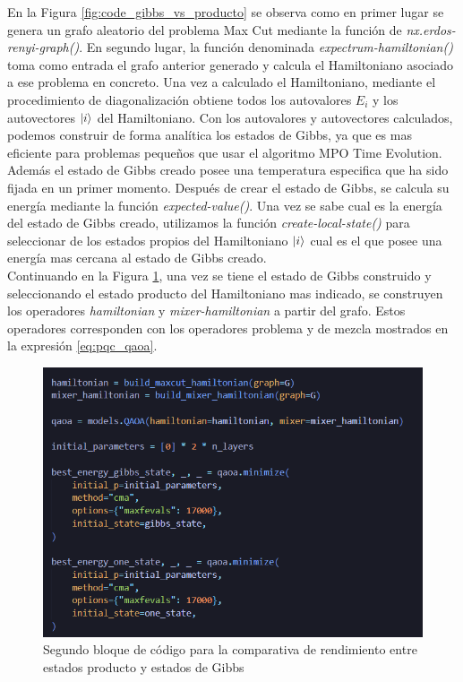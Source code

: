 \newpage

En la Figura \ref{fig:code_gibbs_vs_producto} se observa como en primer lugar se genera un grafo aleatorio del problema Max Cut mediante la función de \textit{nx.erdos-renyi-graph()}. En segundo lugar, la función denominada \textit{expectrum-hamiltonian()} toma como entrada el grafo anterior generado y calcula el Hamiltoniano asociado a ese problema en concreto. Una vez a calculado el Hamiltoniano, mediante el procedimiento de diagonalización obtiene todos los autovalores $E_i$ y los autovectores $\ket{i}$ del Hamiltoniano. Con los autovalores y autovectores calculados, podemos construir de forma analítica los estados de Gibbs, ya que es mas eficiente para problemas pequeños que usar el algoritmo MPO Time Evolution. Además el estado de Gibbs creado posee una temperatura especifica que ha sido fijada en un primer momento. Después de crear el estado de Gibbs, se calcula su energía mediante la función \textit{expected-value()}. Una vez se sabe cual es la energía del estado de Gibbs creado, utilizamos la función \textit{create-local-state()} para seleccionar de los estados propios del Hamiltoniano $\ket{i}$ cual es el que posee una energía mas cercana al estado de Gibbs creado. \\

Continuando en la Figura \ref{fig:code_gibbs_vs_producto_2}, una vez se tiene el estado de Gibbs construido y seleccionando el estado producto del Hamiltoniano mas indicado, se construyen los operadores \textit{hamiltonian} y \textit{mixer-hamiltonian} a partir del grafo. Estos operadores corresponden con los operadores problema y de mezcla mostrados en la expresión \ref{eq:pqc_qaoa}.


\begin{figure}[!h]
    \centering
    \includegraphics[scale = 0.6]{plt/a09-codigo_producto_vs_gibbs_2.png}
    \caption{Segundo bloque de código para la comparativa de rendimiento entre estados producto y estados de Gibbs}
    \label{fig:code_gibbs_vs_producto_2}
\end{figure}

